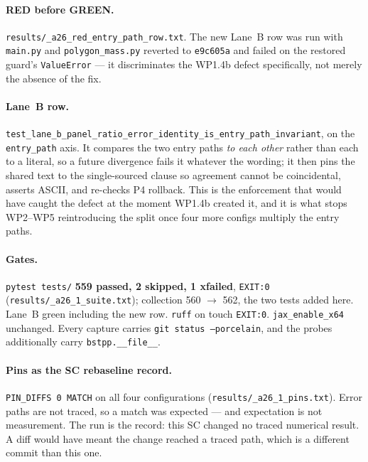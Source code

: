 \documentclass[
  10pt,
]{article}
\begin{document}
\paragraph{RED before GREEN.}
\texttt{results/\allowbreak{}\_a26\_red\_\allowbreak{}entry\_path\_row.txt}. The new Lane~B row was run with \texttt{main.py} and \texttt{polygon\_mass.py} reverted to \texttt{e9c605a} and failed on the restored guard's \texttt{ValueError} --- it discriminates the WP1.4b defect specifically, not merely the absence of the fix.

\paragraph{Lane~B row.}
\texttt{test\_lane\_b\_panel\_ratio\_error\_identity\_is\_entry\_path\_invariant}, on the \texttt{entry\_path} axis. It compares the two entry paths \emph{to each other} rather than each to a literal, so a future divergence fails it whatever the wording; it then pins the shared text to the single-sourced clause so agreement cannot be coincidental, asserts ASCII, and re-checks P4 rollback. This is the enforcement that would have caught the defect at the moment WP1.4b created it, and it is what stops WP2--WP5 reintroducing the split once four more configs multiply the entry paths.

\paragraph{Gates.}
\texttt{pytest tests/} \textbf{559 passed, 2 skipped, 1 xfailed}, \texttt{EXIT:0} (\texttt{results/\allowbreak{}\_a26\_1\_suite.txt}); collection 560 $\rightarrow$ 562, the two tests added here. Lane~B green including the new row. \texttt{ruff} on touch \texttt{EXIT:0}. \texttt{jax\_enable\_x64} unchanged. Every capture carries \texttt{git status --porcelain}, and the probes additionally carry \texttt{bstpp.\_\_file\_\_}.

\paragraph{Pins as the SC rebaseline record.}
\texttt{PIN\_DIFFS 0 MATCH} on all four configurations (\texttt{results/\allowbreak{}\_a26\_1\_pins.txt}). Error paths are not traced, so a match was expected --- and expectation is not measurement. The run is the record: this SC changed no traced numerical result. A diff would have meant the change reached a traced path, which is a different commit than this one.
\end{document}
